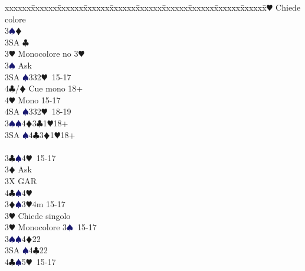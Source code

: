 \documentclass[a4paper,italian]{article}
\newcommand{\BC}{\textcolor{OliveGreen}{$\clubsuit$}}
\newcommand{\BD}{\textcolor{RedOrange}{$\vardiamondsuit$}}
\newcommand{\BH}{\textcolor{Red2}{$\varheartsuit${}}}
\newcommand{\BS}{\textcolor{MidnightBlue}{$\spadesuit${}}}
\newenvironment{bidtable}
{\begin{tabbing}

    xxxxxx\=xxxxxx\=xxxxxx\=xxxxxx\=xxxxxx\=xxxxxx\=xxxxxx\=xxxxxx\=xxxxxx\=xxxxxx\=\kill}
{\end{tabbing} }%
\begin{document}
\begin{multicols}{2}
\begin{bidtable}
                                            3\BH \> Chiede colore\+\\
                                            3\BS {}\BD \\
                                            3SA \BC \-\-\\
                                            3\BH \> Monocolore no 3\BH \+\\
                                            3\BS \> Ask\+\\
                                            3SA \BS 332\BH\ 15-17\\
                                            4\BC/\BD \> Cue mono 18+\\
                                            4\BH \> Mono 15-17\\
                                            4SA \BS 332\BH\ 18-19\-\-\\
                                            3\BS {}\BS4\BD3\BC1\BH 18+\\
                                            3SA \BS4\BC3\BD1\BH 18+\-\-\\
                                            \\
                                            3\BC {}\BS 4\BH\ 15-17\+\\
                                            3\BD \> Ask\+\\
                                            3X \> GAR\\
                                            4\BC {}\BS 4\BH \-\-\\
                                            3\BD {}\BS 3\BH 4m 15-17\+\\
                                            3\BH \> Chiede singolo\-\\
                                            3\BH \> Monocolore 3\BS\ 15-17\\
                                            3\BS {}\BS 4\BD 22\\
                                            3SA \BS 4\BC 22\\
                                            4\BC {}\BS 5\BH\ 15-17\\
                                        \end{bidtable}

\end{multicols}
\end{document}
